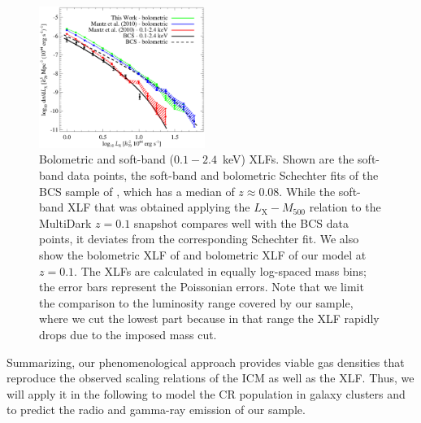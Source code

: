 \documentclass[traditabstract]{aa}
\newcommand{\rmn}{\mathrm}
\begin{document}
\begin{figure}[t]
\centering
\includegraphics[width=0.48\textwidth]{figures/xlf.eps}
\caption{Bolometric and soft-band ($0.1-2.4$~keV) XLFs. Shown are the soft-band
  data points, the soft-band and bolometric Schechter fits of the BCS sample of
  \cite{1997ApJ...479L.101E}, which has a median of $z \approx 0.08$.  While the
  soft-band XLF that was obtained applying the \cite{2010MNRAS.406.1773M}
  $L_{\rmn{X}}-M_{500}$ relation to the MultiDark $z = 0.1$ snapshot compares
  well with the BCS data points, it deviates from the corresponding Schechter
  fit. We also show the bolometric XLF of \cite{2010MNRAS.406.1773M} and
  bolometric XLF of our model at $z=0.1$. The XLFs are calculated in equally
  log-spaced mass bins; the error bars represent the Poissonian errors. Note
  that we limit the comparison to the luminosity range covered by our sample,
  where we cut the lowest part because in that range the XLF rapidly drops due
  to the imposed mass cut.  }
\label{fig:XLF}
\end{figure}

Summarizing, our phenomenological approach provides viable gas densities that
reproduce the observed scaling relations of the ICM as well as the XLF. Thus, we
will apply it in the following to model the CR population in galaxy clusters and
to predict the radio and gamma-ray emission of our sample.


\end{document}
